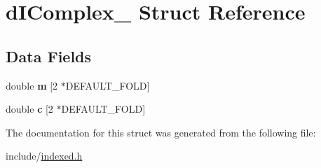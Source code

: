 \hypertarget{structd_i_complex__}{}\section{d\+I\+Complex\+\_\+ Struct Reference}
\label{structd_i_complex__}
\subsection*{Data Fields}
\begin{DoxyCompactItemize}
\item 
\hypertarget{structd_i_complex___a32e03d5477596d481cfd4f0de0f44de4}{}double {\bfseries m} \mbox{[}2 $\ast$D\+E\+F\+A\+U\+L\+T\+\_\+\+F\+O\+L\+D\mbox{]}\label{structd_i_complex___a32e03d5477596d481cfd4f0de0f44de4}

\item 
\hypertarget{structd_i_complex___a5d5ccde1ba4eef3e5bc8991f463b10ca}{}double {\bfseries c} \mbox{[}2 $\ast$D\+E\+F\+A\+U\+L\+T\+\_\+\+F\+O\+L\+D\mbox{]}\label{structd_i_complex___a5d5ccde1ba4eef3e5bc8991f463b10ca}

\end{DoxyCompactItemize}


The documentation for this struct was generated from the following file\+:\begin{DoxyCompactItemize}
\item 
include/\hyperlink{indexed_8h}{indexed.\+h}\end{DoxyCompactItemize}
